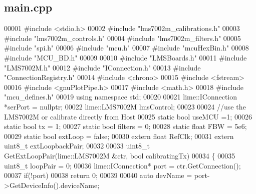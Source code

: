 \subsection{main.\+cpp}
\label{mcu__program_2host__src_2main_8cpp_source}

\begin{DoxyCode}
00001 \textcolor{preprocessor}{#include <stdio.h>}
00002 \textcolor{preprocessor}{#include "lms7002m_calibrations.h"}
00003 \textcolor{preprocessor}{#include "lms7002m_controls.h"}
00004 \textcolor{preprocessor}{#include "lms7002m_filters.h"}
00005 \textcolor{preprocessor}{#include "spi.h"}
00006 \textcolor{preprocessor}{#include "mcu.h"}
00007 \textcolor{preprocessor}{#include "mcuHexBin.h"}
00008 \textcolor{preprocessor}{#include "MCU_BD.h"}
00009 
00010 \textcolor{preprocessor}{#include "LMSBoards.h"}
00011 \textcolor{preprocessor}{#include "LMS7002M.h"}
00012 \textcolor{preprocessor}{#include "IConnection.h"}
00013 \textcolor{preprocessor}{#include "ConnectionRegistry.h"}
00014 \textcolor{preprocessor}{#include <chrono>}
00015 \textcolor{preprocessor}{#include <fstream>}
00016 \textcolor{preprocessor}{#include <gnuPlotPipe.h>}
00017 \textcolor{preprocessor}{#include <math.h>}
00018 \textcolor{preprocessor}{#include "mcu_defines.h"}
00019 \textcolor{keyword}{using namespace }std;
00020 
00021 lime::IConnection *serPort = \textcolor{keyword}{nullptr};
00022 lime::LMS7002M lmsControl;
00023 
00024 \textcolor{comment}{//use the LMS7002M or calibrate directly from Host}
00025 \textcolor{keyword}{static} \textcolor{keywordtype}{bool} useMCU =1;
00026 \textcolor{keyword}{static} \textcolor{keywordtype}{bool} tx = 1;
00027 \textcolor{keyword}{static} \textcolor{keywordtype}{bool} filters = 0;
00028 \textcolor{keyword}{static} \textcolor{keywordtype}{float} FBW = 5e6;
00029 \textcolor{keyword}{static} \textcolor{keywordtype}{bool} extLoop = \textcolor{keyword}{false};
00030 \textcolor{keyword}{extern} \textcolor{keywordtype}{float} RefClk;
00031 \textcolor{keyword}{extern} uint8\_t extLoopbackPair;
00032 
00033 uint8\_t GetExtLoopPair(lime::LMS7002M &ctr, \textcolor{keywordtype}{bool} calibratingTx)
00034 \{
00035     uint8\_t loopPair = 0;
00036     lime::IConnection* port = ctr.GetConnection();
00037     \textcolor{keywordflow}{if}(!port)
00038         \textcolor{keywordflow}{return} 0;
00039 
00040     \textcolor{keyword}{auto} devName = port->GetDeviceInfo().deviceName;

\end{DoxyCode}
